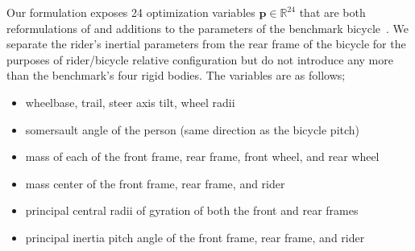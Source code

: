 \documentclass{bmd2019a}
\begin{document}
Our formulation exposes 24 optimization variables
$\mathbf{p}\in\mathbb{R}^{24}$ that are both reformulations of and additions to
the parameters of the benchmark bicycle~\cite{Meijaard2007}. We separate the
rider's inertial parameters from the rear frame of the bicycle for the purposes
of rider/bicycle relative configuration but do not introduce any more than the
benchmark's four rigid bodies. The variables are as follows;
%
\begin{itemize}
  \itemsep-0.25em
  \item wheelbase, trail, steer axis tilt, wheel radii
  \item somersault angle of the person (same direction as the bicycle pitch)
  \item mass of each of the front frame, rear frame, front wheel, and rear wheel
  \item mass center of the front frame, rear frame, and rider
  \item principal central radii of gyration of both the front and rear frames
  \item principal inertia pitch angle of the front frame, rear frame, and rider
\end{itemize}
\end{document}
